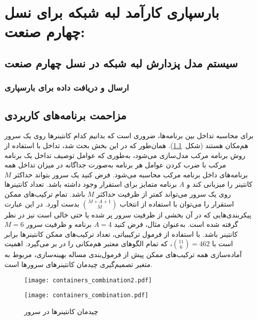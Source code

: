 
\chapter{بارسپاری کارآمد لبه شبکه برای نسل چهارم صنعت:}\label{chap:model}

\section{سیستم مدل پزدارش لبه شبکه در نسل چهارم صنعت}

\subsection{ارسال و دریافت داده برای بارسپاری}

\section{مزاحمت برنامه‌های کاربردی}
\label{subsec:interference_model}

برای محاسبه تداخل بین برنامه‌ها، ضروری است که بدانیم کدام کانتینرها روی یک سرور هم‌مکان هستند (شکل~\ref{figure:containers_combination}). همان‌طور که در این بخش بحث شد، تداخل با استفاده از روش برنامه مرکب مدل‌سازی می‌شود، به‌طوری که عوامل توصیف تداخل یک برنامه مرکب با ضرب کردن عوامل هر برنامه به‌صورت جداگانه در میزان تداخل همه برنامه‌های داخل برنامه مرکب محاسبه می‌شود. فرض کنید یک سرور بتواند حداکثر $M$ کانتینر را میزبانی کند و $A$ برنامه متمایز برای استقرار وجود داشته باشد. تعداد کانتینرها روی یک سرور می‌تواند کمتر از ظرفیت حداکثر $M$ باشد. تمام ترکیب‌های ممکن استقرار را می‌توان با استفاده از انتخاب $\binom{M+A+1}{M}$ بدست آورد. در این عبارت پیکربندی‌هایی که در آن بخشی از ظرفیت سرور پر شده یا حتی خالی است نیز در نظر گرفته شده است. به‌عنوان مثال، فرض کنید $A=4$ برنامه و ظرفیت سرور $M=6$ کانتینر باشد. با استفاده از فرمول ترکیبیاتی، تعداد ترکیب‌های ممکن کانتینرها برابر است با $\binom{11}{6}=462$، که تمام الگوهای معتبر هم‌مکانی را در بر می‌گیرد. اهمیت آماده‌سازی همه ترکیب‌های ممکن پیش از فرمول‌بندی مساله بهینه‌سازی، مربوط به متغیر تصمیم‌گیری چیدمان کانتینرهای سرورها است.

\vspace{0.5cm}
\begin{figure}[h]
\begin{minipage}{0.45\textwidth}
\centering
\texttt{[image: containers\_combination2.pdf]}
\end{minipage}\hfill
\begin{minipage}{0.45\textwidth}
\centering
\texttt{[image: containers\_combination.pdf]}
\end{minipage}\hfill
\caption{چیدمان کانتینرها در سرور}
\label{figure:containers_combination}
\end{figure}
\vspace{0.5cm}

